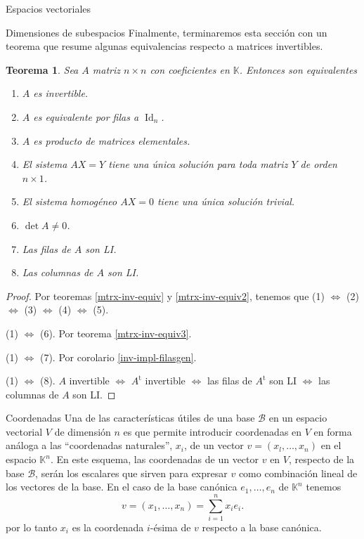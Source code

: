 \documentclass[a4paper,12pt,twoside,spanish,reqno]{amsbook}
\newtheorem{teorema}{Teorema}[section]
\theoremstyle{definition}
\theoremstyle{remark}
\newcommand{\Id}{\operatorname{Id}}
\renewcommand{\t}{{\operatorname{t}}}
\newcommand{\K}{\mathbb K}
\begin{document}
\begin{chapter}{Espacios vectoriales}
\begin{section}{Dimensiones de subespacios}
Finalmente, terminaremos esta sección con un teorema que resume algunas equivalencias respecto a matrices invertibles.

\begin{teorema}
    Sea $A$ matriz $n \times n$ con coeficientes en $\K$. Entonces son equivalentes
    \begin{enumerate} 
        \item $A$ es invertible.
        \item $A$  es equivalente por filas a $\Id_n$.
        \item $A$ es producto de matrices elementales.
        \item El sistema $AX=Y$ tiene una única solución para toda matriz $Y$ de orden $n \times 1$. 
        \item El sistema homogéneo $AX=0$ tiene una única solución trivial.
        \item $\det A \ne 0$.
        \item Las filas de $A$ son LI.
        \item Las columnas de $A$ son LI.
    \end{enumerate}
\end{teorema}
\begin{proof} Por teoremas \ref{mtrx-inv-equiv} y  \ref{mtrx-inv-equiv2}, tenemos que 	(1) $\Leftrightarrow$ 	(2) $\Leftrightarrow$ 	(3) $\Leftrightarrow$ 	(4) $\Leftrightarrow$ 	(5).
    
    (1) $\Leftrightarrow$ (6). Por teorema \ref{mtrx-inv-equiv3}.
    
    (1) $\Leftrightarrow$ (7). Por corolario \ref{inv-impl-filasgen}.
    
    (1) $\Leftrightarrow$ (8). $A$ invertible $\Leftrightarrow$ $A^\t$ invertible $\Leftrightarrow$  las filas de $A^\t$ son LI $\Leftrightarrow$  las columnas de $A$ son LI. 
\end{proof}
    
    \end{section}




    \begin{section}{Coordenadas}
        Una de las características útiles de una base $\mathcal B$ en un espacio vectorial  $V$ de dimensión $n$ es que permite introducir coordenadas en $V$ en forma análoga a las ``coordenadas naturales'', $x_i$, de un vector $v = (x_l,\ldots, x_n)$ en el espacio $\K^n$. En este esquema, las coordenadas de un vector $v$ en $V$, respecto de la base $\mathcal B$, serán los escalares que sirven para expresar $v$ como combinación lineal de los vectores de la base. En  el caso  de la base canónica $e_1,\ldots,e_n$ de $\K^n$ tenemos
        $$
        v = (x_1,\ldots,x_n) = \sum_{i=1}^{n} x_ie_i.
        $$
        por lo tanto $x_i$  es la coordenada $i$-ésima de $v$ respecto a la base canónica. 
        

\end{section}
\end{chapter}
\end{document}
